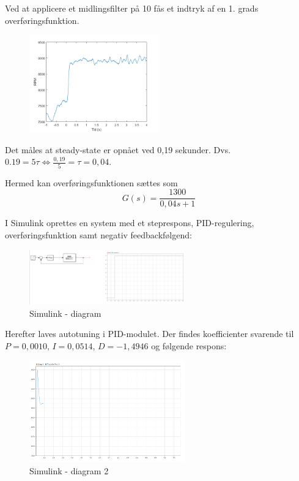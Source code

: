 Ved at applicere et midlingsfilter på 10 fås et indtryk af en 1. grads overføringsfunktion.

\begin{figure}[h]
  \centering
  \includegraphics[width=0.5\textwidth]{./figurer/mo5.png}
  \caption{}
  \label{fig:mo5}
\end{figure}

Det måles at steady-state er opnået ved 0,19 sekunder. Dvs. $0.19 = 5\tau \Leftrightarrow \frac{0,19}{5}=\tau=0,04$.

Hermed kan overføringsfunktionen sættes som
\begin{equation}
  \label{eq:1}
G(s) = \frac{1300}{0,04s+1}  
\end{equation}


I Simulink oprettes en system med et steprespons, PID-regulering, overføringsfunktion samt negativ feedbackfølgend:

\begin{figure}[h]
  \centering
  \includegraphics[width=0.6\textwidth]{./figurer/sbil1.png}
  \caption{Simulink - diagram}
  \label{fig:sbil1}
\end{figure}

Herefter laves autotuning i PID-modulet. Der findes koefficienter svarende til $P=0,0010$, $I=0,0514$, $D=-1,4946$ og følgende respons:

\begin{figure}[h]
  \centering
  \includegraphics[width=0.6\textwidth]{./figurer/sbil2.png}
  \caption{Simulink - diagram 2}
  \label{fig:sbil1}
\end{figure}

